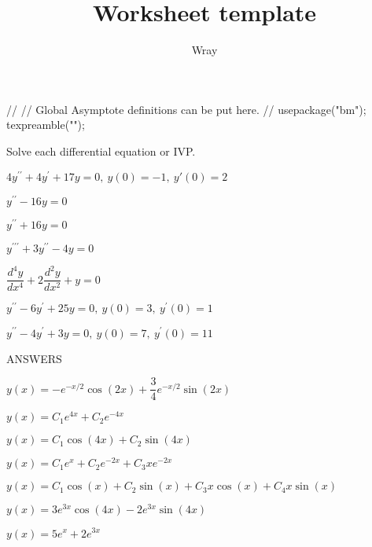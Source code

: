\documentclass[addpoints, 12pt]{exam}
\title{Worksheet template}
\author{Wray}
\begin{document}
\begin{asydef}
//
// Global Asymptote definitions can be put here.
//
usepackage("bm");
texpreamble("\def\V#1{\bm{#1}}");
\end{asydef}


\bigskip

Solve each differential equation or IVP.

\begin{questions}

\question
$4y^{\prime \prime} + 4y^{\prime} + 17y = 0, \> y(0) = -1, \> y'(0) = 2$

\question
$y^{\prime \prime} - 16y = 0$

\question
$y^{\prime \prime} + 16y = 0$

\question
$y^{\prime \prime \prime} + 3y^{\prime \prime} - 4y = 0$

\question
$\dfrac{d^4y}{dx^4} +2 \dfrac{d^2y}{dx^2} +y = 0$

\question
$y^{\prime \prime} - 6y^{\prime} + 25y = 0, \> y(0) = 3, \> y^{\prime} (0) = 1$

\question
$y^{\prime \prime} - 4y^{\prime} + 3y = 0, \> y(0) = 7, \> y^{\prime} (0) = 11$

\end{questions}

\clearpage

ANSWERS

\bigskip

\begin{questions}

\question
$y(x) = -e^{-x/2} \cos \left( 2x \right) + \dfrac{3}{4} e^{-x/2} \sin \left( 2x \right) $

\question
$y(x) = C_1 e^{4x} + C_2 e^{-4x}$

\question
$y(x) = C_1 \cos \left( 4x \right) + C_2 \sin \left( 4x \right)$

\question
$y(x) = C_1 e^x + C_2 e^{-2x} + C_3 xe^{-2x}$

\question
$y(x) = C_1 \cos \left( x \right) + C_2 \sin \left( x \right) + C_3 x \cos \left( x \right)
	+ C_4 x \sin \left( x \right)$
    
\question
$y(x) = 3 e^{3x} \cos \left( 4x \right) - 2 e^{3x} \sin \left( 4x \right)$

\question
$y(x) = 5e^x + 2e^{3x}$

\end{questions}
\end{document}
